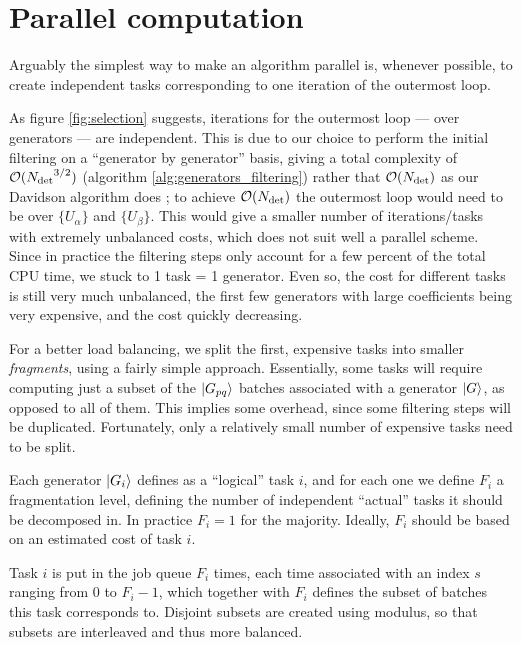 \documentclass[./thesis.tex]{subfiles}
\begin{document}
\clearpage
\section{Parallel computation}

Arguably the simplest way to make an algorithm parallel is, whenever possible, to create independent tasks corresponding to one iteration of the outermost loop. 

As figure \ref{fig:selection} suggests, iterations for the outermost loop --- over generators --- are independent. This is due to our choice to perform the initial filtering on a ``generator by generator'' basis, giving a total complexity of $\mathcal{O}({N_\text{det}}^{3/2})$ (algorithm \ref{alg:generators_filtering}) rather that $\mathcal{O}({N_\text{det}})$ as our Davidson algorithm does ; to achieve $\mathcal{O}({N_\text{det}})$ the outermost loop would need to be over $\{U_\alpha\}$ and $\{U_\beta\}$. This would give a smaller number of iterations/tasks with extremely unbalanced costs, which does not suit well a parallel scheme. Since in practice the filtering steps only account for a few percent of the total CPU time, we stuck to 1 task = 1 generator. Even so, the cost for different tasks is still very much unbalanced, the first few generators with large coefficients being very expensive, and the cost quickly decreasing.

For a better load balancing, we split the first, expensive tasks into smaller \emph{fragments}, using a fairly simple approach. Essentially, some tasks will require computing just a subset of the $\ket {G_{pq}}$ batches associated with a generator $\ket G$, as opposed to all of them. This implies some overhead, since some filtering steps will be duplicated. Fortunately, only a relatively small number of expensive tasks need to be split.



Each generator $\ket {G_i}$ defines as a ``logical'' task $i$, and for each one we define $F_i$ a fragmentation level, defining the number of independent ``actual'' tasks it should be decomposed in. In practice $F_i = 1$ for the majority. Ideally, $F_i$ should be based on an estimated cost of task $i$. 

Task $i$ is put in the job queue $F_i$ times, each time associated with an index $s$ ranging from $0$ to $F_i-1$, which together with $F_i$ defines the subset of batches this task corresponds to. Disjoint subsets are created using modulus, so that subsets are interleaved and thus more balanced.
 
\end{document}
